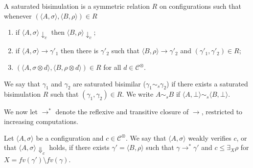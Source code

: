 \documentclass{llncs}
\begin{document}
\begin{definition}\label{def:strongsb} A saturated bisimulation is a symmetric relation $R$ on configurations such that whenever
$( \langle A, \sigma \rangle,\langle B, \rho \rangle) \in R$
\begin{enumerate}
\item if $\langle A, \sigma \rangle \downarrow_c$ then $\langle B, \rho \rangle \downarrow_c$;
\item if $\langle A, \sigma \rangle \longrightarrow \gamma'_1$ then there is $\gamma'_2$ such that $\langle B, \rho \rangle \longrightarrow \gamma'_2$ and $(\gamma'_1, \gamma'_2) \in R$;
\item $(\langle A,\sigma \otimes d\rangle, \langle B,\rho \otimes d \rangle) \in R$ for  all $d \in \mathcal{C}^\otimes$.
\end{enumerate}
We say that $\gamma_1$ and $\gamma_2$ are  saturated bisimilar ($\gamma_1  \sim_{\mathit{s}} \gamma_2$) if there exists a  saturated  bisimulation $R$ such that $(\gamma_1 , \gamma_2 ) \in R$. We write $A \sim_{\mathit{s}} B$ if $\langle A, \bot\rangle \sim_{\mathit{s}} \langle B, \bot \rangle$.
\end{definition}

We now let $\longrightarrow^*$ denote the reflexive and transitive closure of $\longrightarrow$, restricted to increasing computations.

\begin{definition} 
Let $\langle A, \sigma \rangle$ be a configuration and $c \in \mathcal{C}^\otimes$.
We say that $\langle A, \sigma \rangle$ weakly verifies $c$, or that $\langle A, \sigma \rangle \Downarrow_c$ holds, 
if  there exists $\gamma' = \langle B, \rho \rangle$ such that 
$\gamma \longrightarrow^* \gamma'$ and $c \leq \exists_{X} \rho$ for $X = fv(\gamma') \setminus fv(\gamma)$.
\end{definition}
\end{document}
